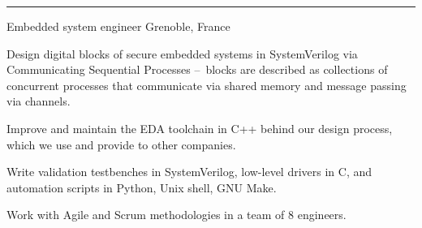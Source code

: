 \vspace{+2mm}\vspace{-3mm}
\rule{\textwidth}{0.5pt}\vspace{-1mm}

\begin{cventries}
\vspace{-5mm}

\cventry
{}
{\vspace{-9mm}Embedded system engineer } %
{\vspace{-9mm}\normalcolor Grenoble, France} %
{} %
{
\begin{cvitems}
\item{Design digital blocks of secure embedded systems in SystemVerilog via 
Communicating Sequential Processes --~blocks are described as collections of 
concurrent processes that communicate via shared memory and message passing via 
channels.}
\item{Improve and maintain the EDA toolchain in C++ behind our design 
process, which we use and provide to other companies.}
\item{Write validation testbenches in SystemVerilog, low-level drivers 
in C, and automation scripts in Python, Unix shell, GNU Make.}
\item{Work with Agile and Scrum methodologies in a team of 8 engineers.}
\end{cvitems}
}
\vspace{-5mm}


\end{cventries}
